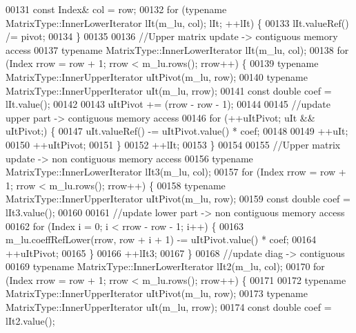 \begin{DoxyCode}
00131         \textcolor{keyword}{const} Index& col = row;
00132         \textcolor{keywordflow}{for} (\textcolor{keyword}{typename} MatrixType::InnerLowerIterator lIt(m\_lu, col); lIt; ++lIt) \{
00133             lIt.valueRef() /= pivot;
00134         \}
00135 
00136         \textcolor{comment}{//Upper matrix update -> contiguous memory access}
00137         \textcolor{keyword}{typename} MatrixType::InnerLowerIterator lIt(m\_lu, col);
00138         \textcolor{keywordflow}{for} (Index rrow = row + 1; rrow < m\_lu.rows(); rrow++) \{
00139             \textcolor{keyword}{typename} MatrixType::InnerUpperIterator uItPivot(m\_lu, row);
00140             \textcolor{keyword}{typename} MatrixType::InnerUpperIterator uIt(m\_lu, rrow);
00141             \textcolor{keyword}{const} \textcolor{keywordtype}{double} coef = lIt.value();
00142 
00143             uItPivot += (rrow - row - 1);
00144 
00145             \textcolor{comment}{//update upper part  -> contiguous memory access}
00146             \textcolor{keywordflow}{for} (++uItPivot; uIt && uItPivot;) \{
00147                 uIt.valueRef() -= uItPivot.value() * coef;
00148 
00149                 ++uIt;
00150                 ++uItPivot;
00151             \}
00152             ++lIt;
00153         \}
00154 
00155         \textcolor{comment}{//Upper matrix update -> non contiguous memory access}
00156         \textcolor{keyword}{typename} MatrixType::InnerLowerIterator lIt3(m\_lu, col);
00157         \textcolor{keywordflow}{for} (Index rrow = row + 1; rrow < m\_lu.rows(); rrow++) \{
00158             \textcolor{keyword}{typename} MatrixType::InnerUpperIterator uItPivot(m\_lu, row);
00159             \textcolor{keyword}{const} \textcolor{keywordtype}{double} coef = lIt3.value();
00160 
00161             \textcolor{comment}{//update lower part ->  non contiguous memory access}
00162             \textcolor{keywordflow}{for} (Index i = 0; i < rrow - row - 1; i++) \{
00163                 m\_lu.coeffRefLower(rrow, row + i + 1) -= uItPivot.value() * coef;
00164                 ++uItPivot;
00165             \}
00166             ++lIt3;
00167         \}
00168         \textcolor{comment}{//update diag -> contiguous}
00169         \textcolor{keyword}{typename} MatrixType::InnerLowerIterator lIt2(m\_lu, col);
00170         \textcolor{keywordflow}{for} (Index rrow = row + 1; rrow < m\_lu.rows(); rrow++) \{
00171 
00172             \textcolor{keyword}{typename} MatrixType::InnerUpperIterator uItPivot(m\_lu, row);
00173             \textcolor{keyword}{typename} MatrixType::InnerUpperIterator uIt(m\_lu, rrow);
00174             \textcolor{keyword}{const} \textcolor{keywordtype}{double} coef = lIt2.value();

\end{DoxyCode}

